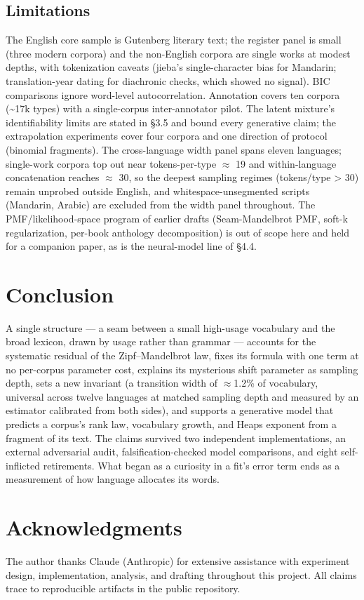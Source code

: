 \documentclass[11pt]{article}
\begin{document}
\subsection{Limitations}
The English core sample is Gutenberg literary text; the register panel is small (three modern corpora) and the non-English corpora are single works at modest depths, with tokenization caveats (jieba's single-character bias for Mandarin; translation-year dating for diachronic checks, which showed no signal). BIC comparisons ignore word-level autocorrelation. Annotation covers ten corpora (\~{}17k types) with a single-corpus inter-annotator pilot. The latent mixture's identifiability limits are stated in \S3.5 and bound every generative claim; the extrapolation experiments cover four corpora and one direction of protocol (binomial fragments). The cross-language width panel spans eleven languages; single-work corpora top out near tokens-per-type $\approx$ 19 and within-language concatenation reaches $\approx$ 30, so the deepest sampling regimes (tokens/type > 30) remain unprobed outside English, and whitespace-unsegmented scripts (Mandarin, Arabic) are excluded from the width panel throughout. The PMF/likelihood-space program of earlier drafts (Seam-Mandelbrot PMF, soft-k regularization, per-book anthology decomposition) is out of scope here and held for a companion paper, as is the neural-model line of \S4.4.

\section{Conclusion}
A single structure --- a seam between a small high-usage vocabulary and the broad lexicon, drawn by usage rather than grammar --- accounts for the systematic residual of the Zipf--Mandelbrot law, fixes its formula with one term at no per-corpus parameter cost, explains its mysterious shift parameter as sampling depth, sets a new invariant (a transition width of $\approx$1.2\% of vocabulary, universal across twelve languages at matched sampling depth and measured by an estimator calibrated from both sides), and supports a generative model that predicts a corpus's rank law, vocabulary growth, and Heaps exponent from a fragment of its text. The claims survived two independent implementations, an external adversarial audit, falsification-checked model comparisons, and eight self-inflicted retirements. What began as a curiosity in a fit's error term ends as a measurement of how language allocates its words.

\section{Acknowledgments}
The author thanks Claude (Anthropic) for extensive assistance with experiment design, implementation, analysis, and drafting throughout this project. All claims trace to reproducible artifacts in the public repository.
\end{document}
